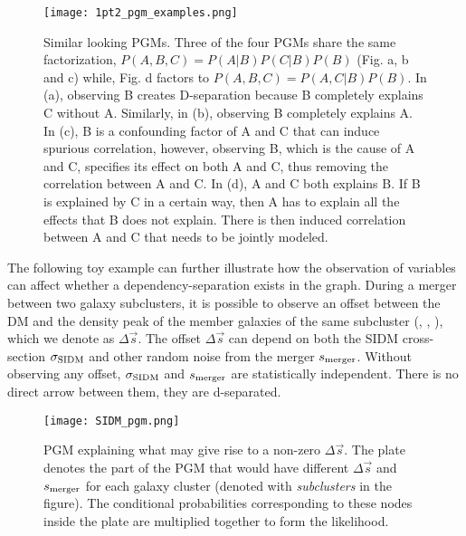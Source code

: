 \begin{figure*}[h]
	\begin{center}
	\texttt{[image: 1pt2\_pgm\_examples.png]}
	\caption{
		Similar looking PGMs.	Three of the four PGMs share the same factorization, 
		$P(A, B, C) = P(A | B) P(C | B) P(B)$ (Fig.
		a, b and c) while, Fig. d factors to $P(A, B, C) = P(A, C |
		B) P(B)$. In (a), observing B creates D-separation because B completely
		explains C without A. Similarly, in (b), observing B completely explains A. 
		In (c), B is a confounding factor of A and C that can induce spurious correlation,
		however, observing B, which is the cause of A and C, specifies
		its effect on both A and C, thus removing the correlation between A and C. 
		In (d), A and C both explains B. If B is explained by C
		in a certain way, then A has to explain all the effects that B
		does not explain. There is then induced correlation between A and C that
		needs to be jointly modeled. 
		\label{fig:pgm_examples}
	}
	\end{center}
\end{figure*}

The following toy example can further illustrate how the observation of variables
can affect whether a dependency-separation exists in the graph. 
During a merger between two galaxy subclusters, it is possible to observe an
offset between the DM and the density peak of the member galaxies of the
same subcluster (\citealt{Markevitch2004}, \citealt{Dawson12}, \citealt{Ng2014}), 
which we denote as  $\Delta \vec{s}$. The offset $\Delta \vec{s}$ can depend on both 
the SIDM cross-section $\sigma_{\rm SIDM}$ and other random noise from the 
merger $s_{\rm merger}$. 
Without observing any offset, $\sigma_{\rm SIDM}$ and $s_{\rm merger}$ are
statistically independent. There is no direct arrow between them, they are
d-separated. 

\begin{figure*}[h]
	\begin{center}
	\texttt{[image: SIDM\_pgm.png]}
	\caption{PGM explaining what may give rise to a non-zero $\Delta \vec{s}$.
		The plate denotes the part of the PGM that would have different 
		$\Delta \vec{s}$ and $s_{\rm merger}$ for each galaxy cluster (denoted
		with {\it subclusters} in the figure).
		The conditional probabilities corresponding to these nodes inside the plate
		are multiplied together to form the likelihood.
		\label{fig:SIDM_inference}
	}
	\end{center}
\end{figure*}


